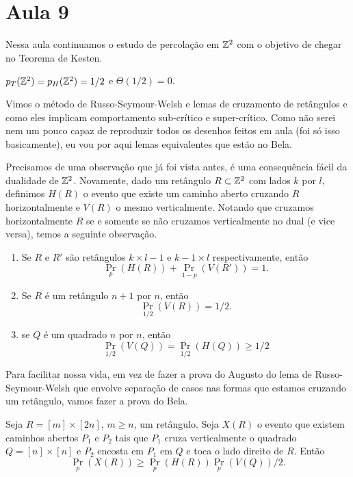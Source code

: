 \section{Aula 9}

Nessa aula continuamos o estudo de percolação em $\mathbb{Z}^2$ com o objetivo de chegar
no Teorema de Kesten.
\begin{theorem}
	$p_T(\mathbb{Z}^2) = p_H(\mathbb{Z}^2) = 1/2$ e $\Theta(1/2) = 0$.
\end{theorem}

Vimos o método de Russo-Seymour-Welsh e lemas de cruzamento de retângulos
e como eles implicam comportamento sub-crítico e super-crítico. Como não
serei nem um pouco capaz de reproduzir todos os desenhos feitos em
aula (foi só isso basicamente),
eu vou por aqui lemas equivalentes que estão no Bela.

Precisamos de uma observação que já foi vista antes, é uma
consequência fácil da dualidade
de $\mathbb{Z}^2$. Novamente, dado um retângulo $R \subset \mathbb{Z}^2$ com lados
$k$ por $l$, definimos $H(R)$
o evento que existe um caminho aberto cruzando $R$ horizontalmente e
$V(R)$ o mesmo verticalmente.
Notando que cruzamos horizontalmente $R$ se e somente se não
cruzamos verticalmente no dual (e vice versa), temos a seguinte observação.

\begin{observation}
	\begin{enumerate}
		\item Se $R$ e $R'$ são retângulos $k \times l-1$ e $k-1 \times l$
			respectivamente, então
			\[
				\Pr_p(H(R)) + \Pr_{1-p}(V(R')) = 1.
			\]
		\item Se $R$ é um retângulo $n+1$ por $n$, então
			\[\Pr_{1/2}(V(R)) = 1/2.\]

		\item se $Q$ é um quadrado $n$ por $n$, então
			\[\Pr_{1/2}(V(Q)) = \Pr_{1/2}(H(Q)) \geq 1/2\]
	\end{enumerate}
\end{observation}

Para facilitar nossa vida, em vez de fazer a prova do Augusto do lema
de Russo-Seymour-Welsh
que envolve separação de casos nas formas que estamos cruzando um
retângulo, vamos fazer a prova
do Bela.

\begin{lemma}
	Seja $R = [m]\times[2n]$, $m \geq n$, um retângulo. Seja $X(R)$ o
	evento que existem caminhos
	abertos $P_1$ e $P_2$ tais que $P_1$ cruza verticalmente o quadrado
	$Q = [n]\times[n]$
	e $P_2$ encosta em $P_1$ em $Q$ e toca o lado direito de $R$. Então
	\[
		\Pr_p(X(R)) \geq \Pr_p(H(R))\Pr_p(V(Q))/2.
	\]
\end{lemma}

